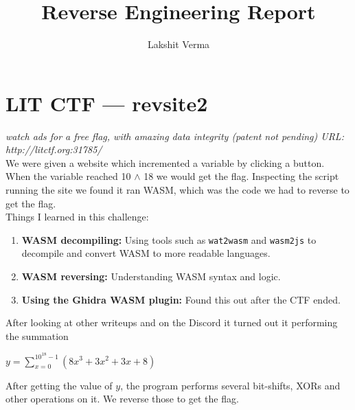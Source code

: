 \documentclass{article}
\title{Reverse Engineering Report}
\author{Lakshit Verma}
\begin{document}
\maketitle

\section*{LIT CTF — revsite2}

\textit{watch ads for a free flag, with amazing data integrity (patent not pending) URL: http://litctf.org:31785/} \\

We were given a website which incremented a variable by clicking a button. When the variable reached 10 $\wedge$ 18 we would get the flag. Inspecting the script running the site we found it ran WASM, which was the code we had to reverse to get the flag. \\

Things I learned in this challenge:

\begin{enumerate}
    \item{\textbf{WASM decompiling:} Using tools such as \texttt{wat2wasm} and \texttt{wasm2js} to decompile and convert WASM to more readable languages.}
    \item{\textbf{WASM reversing:} Understanding WASM syntax and logic.}
    \item{\textbf{Using the Ghidra WASM plugin:} Found this out after the CTF ended.}
\end{enumerate}

After looking at other writeups and on the Discord it turned out it performing the summation

\begin{center}
    $y = \displaystyle\sum_{x=0}^{10^{18}-1} (8x^3 + 3x^2 + 3x + 8)$
\end{center}

After getting the value of $y$, the program performs several bit-shifts, XORs and other operations on it. We reverse those to get the flag.
\end{document}
